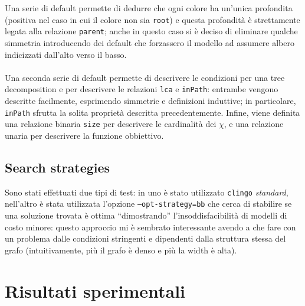 \documentclass{report}
\begin{document}
Una serie di default permette di dedurre che ogni colore ha un'unica profondita (positiva nel caso in cui il colore non sia \texttt{root}) e questa profondità è strettamente
legata alla relazione \texttt{parent}; anche in questo caso si è deciso di eliminare qualche simmetria introducendo dei default che forzassero il modello ad assumere 
albero indicizzati dall'alto verso il basso.
\ \\
\ \\

Una seconda serie di default permette di descrivere le condizioni per una tree decomposition e per descrivere le relazioni
\texttt{lca} e \texttt{inPath}: entrambe vengono descritte facilmente, esprimendo simmetrie e definizioni induttive; in particolare, \texttt{inPath} sfrutta la solita proprietà
descritta precedentemente. Infine, viene definita una relazione binaria \texttt{size} per descrivere le cardinalità dei $\chi$, e una relazione unaria per descrivere
la funzione obbiettivo.

\section{Search strategies}
Sono stati effettuati due tipi di test: in uno è stato utilizzato \texttt{clingo} \textit{standard}, nell'altro è stata utilizzata l'opzione \texttt{--opt-strategy=bb}
che cerca di stabilire se una soluzione trovata è ottima ``dimostrando'' l'insoddisfacibilità di modelli di costo minore: questo approccio mi è sembrato interessante 
avendo a che fare con un problema dalle condizioni stringenti e dipendenti dalla struttura stessa del grafo (intuitivamente, più il grafo è denso e più la width è alta).

\chapter{Risultati sperimentali}
\end{document}
